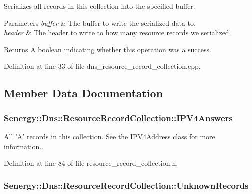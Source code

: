 Serializes all records in this collection into the specified buffer. 


\begin{DoxyParams}{Parameters}
{\em buffer} & The buffer to write the serialized data to. \\
\hline
{\em header} & The header to write to how many resource records we serialized.\\
\hline
\end{DoxyParams}
\begin{DoxyReturn}{Returns}
A boolean indicating whether this operation was a success. 
\end{DoxyReturn}


Definition at line 33 of file dns\-\_\-resource\-\_\-record\-\_\-collection.\-cpp.



\subsection{Member Data Documentation}
\hypertarget{class_senergy_1_1_dns_1_1_resource_record_collection_a0ca3a73fcaabee1703b18c9c8ca453f9}{
\subsubsection[{I\-P\-V4\-Answers}]{ Senergy\-::\-Dns\-::\-Resource\-Record\-Collection\-::\-I\-P\-V4\-Answers}}\label{class_senergy_1_1_dns_1_1_resource_record_collection_a0ca3a73fcaabee1703b18c9c8ca453f9}


All 'A' records in this collection. See the I\-P\-V4\-Address class for more information.. 



Definition at line 84 of file resource\-\_\-record\-\_\-collection.\-h.

\hypertarget{class_senergy_1_1_dns_1_1_resource_record_collection_a1ad19da9ca3420c4aa1ad865099e387d}{
\subsubsection[{Unknown\-Records}]{ Senergy\-::\-Dns\-::\-Resource\-Record\-Collection\-::\-Unknown\-Records}}\label{class_senergy_1_1_dns_1_1_resource_record_collection_a1ad19da9ca3420c4aa1ad865099e387d}


